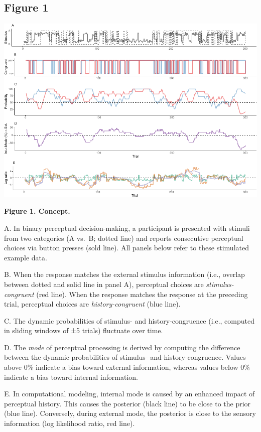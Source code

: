 \documentclass[
]{article}
\begin{document}
\hypertarget{figure-1}{%
\subsection{Figure 1}\label{figure-1}}

\includegraphics{modes_mouse_rev1b_files/figure-latex/Figure_1-1.pdf}

\textbf{Figure 1. Concept.}

A. In binary perceptual decision-making, a participant is presented with
stimuli from two categories (A vs.~B; dotted line) and reports
consecutive perceptual choices via button presses (sold line). All
panels below refer to these stimulated example data.

B. When the response matches the external stimulus information (i.e.,
overlap between dotted and solid line in panel A), perceptual choices
are \emph{stimulus-congruent} (red line). When the response matches the
response at the preceding trial, perceptual choices are
\emph{history-congruent} (blue line).

C. The dynamic probabilities of stimulus- and history-congruence (i.e.,
computed in sliding windows of ±5 trials) fluctuate over time.

D. The \emph{mode} of perceptual processing is derived by computing the
difference between the dynamic probabilities of stimulus- and
history-congruence. Values above 0\% indicate a bias toward external
information, whereas values below 0\% indicate a bias toward internal
information.

E. In computational modeling, internal mode is caused by an enhanced
impact of perceptual history. This causes the posterior (black line) to
be close to the prior (blue line). Conversely, during external mode, the
posterior is close to the sensory information (log likelihood ratio, red
line).
\end{document}
